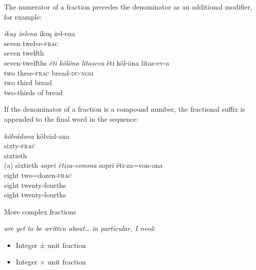 \documentclass[grammar]{subfiles}
\begin{document}
  \newpage
  The numerator of a fraction precedes the denominator as an additional modifier, for example:

  \begin{exe}
    \ex
    \begin{xlist}
      \ex \textit{ikuş żelena}
      \glll ikuş żel-ena\\
      seven twelve\textsc{-frac}\\
      seven twelfth\\
      \glt seven-twelfths
      \ex \textit{ěti kölöna litaseva}
      \glll ěti köl-öna litas-ev-a\\
      two three\textsc{-frac} bread\textsc{-du-nom}\\
      two third bread\\
      \glt two-thirds of bread
    \end{xlist}
  \end{exe}

  If the denominator of a fraction is a compound number, the fractional suffix is appended to the final word in the sequence:

  \begin{exe}
    \ex
    \begin{xlist}
      \ex \textit{kölvádana}
      \glll kölvád-ana\\
      sixty\textsc{-frac}\\
      sixtieth\\
      \glt (a) sixtieth
      \ex \textit{sopri ětiza-vonona}
      \glll sopri ěti-za=von-ona\\
      eight two=dozen\textsc{-frac}\\
      eight twenty-fourths\\
      \glt eight twenty-fourths
    \end{xlist}
  \end{exe}


  More complex fractions {\em are yet to be written about… in particular, I need:
    \begin{itemize}
      \item Integer ± unit fraction
      \item Integer × unit fraction
    \end{itemize}
  }
\end{document}
